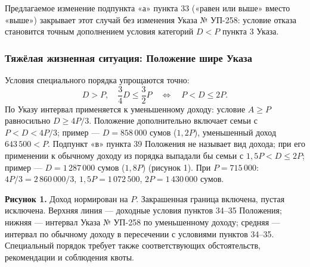 \documentclass[14pt,a4paper]{extarticle}
\begin{document}
Предлагаемое изменение подпункта «а» пункта 33 («равен или выше» вместо «выше») закрывает этот случай без изменения Указа № УП-258: условие отказа становится точным дополнением условия категорий $D<P$ пункта 3 Указа.

\subsubsection{Тяжёлая жизненная ситуация: Положение шире Указа}\label{res:hard}
Условия специального порядка упрощаются точно:
\begin{equation}
D>P,\quad\frac34D\le\frac32P\quad\Longleftrightarrow\quad P<D\le2P.
\end{equation}
По Указу интервал применяется к уменьшенному доходу: условие $A\ge P$ равносильно $D\ge4P/3$. Положение дополнительно включает семьи с $P<D<4P/3$; пример — $D=858\,000$ сумов ($1{,}2P$), уменьшенный доход $643\,500<P$. Подпункт «в» пункта 39 Положения не называет вид дохода; при его применении к обычному доходу из порядка выпадали бы семьи с $1{,}5P<D\le2P$; пример — $D=1\,287\,000$ сумов ($1{,}8P$) (рисунок 1). При $P=715\,000$: $4P/3=2\,860\,000/3$, $1{,}5P=1\,072\,500$, $2P=1\,430\,000$ сумов.

\begin{center}\end{center}
\textbf{Рисунок 1.} Доход нормирован на $P$. Закрашенная граница включена, пустая исключена. Верхняя линия — доходные условия пунктов 34–35 Положения; нижняя — интервал Указа № УП-258 по уменьшенному доходу; средняя — интервал по обычному доходу в пересечении с условиями пунктов 34–35. Специальный порядок требует также соответствующих обстоятельств, рекомендации и соблюдения квоты.
\end{document}
